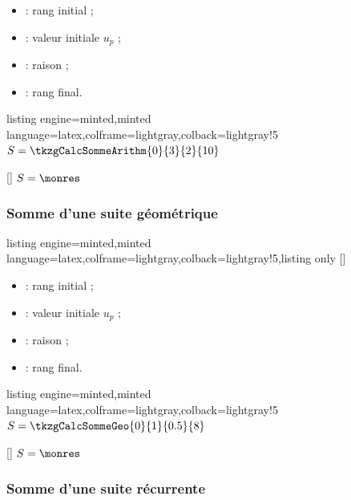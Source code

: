 \documentclass[11pt,a4paper]{ltxdoc}
\begin{document}
\begin{itemize}
  \item {} : rang initial ;
  \item {} : valeur initiale $u_p$ ;
  \item {} : raison ;
  \item {} : rang final.
\end{itemize}

\begin{tcblisting}{listing engine=minted,minted language=latex,colframe=lightgray,colback=lightgray!5}
$S = \tkzgCalcSommeArithm{0}{3}{2}{10}$

[\monres]
$S = \monres$
\end{tcblisting}

\subsubsection{Somme d'une suite géométrique}

\begin{tcblisting}{listing engine=minted,minted language=latex,colframe=lightgray,colback=lightgray!5,listing only}
[\macro]
\end{tcblisting}

\begin{itemize}
  \item {} : rang initial ;
  \item {} : valeur initiale $u_p$ ;
  \item {} : raison ;
  \item {} : rang final.
\end{itemize}

\begin{tcblisting}{listing engine=minted,minted language=latex,colframe=lightgray,colback=lightgray!5}
$S = \tkzgCalcSommeGeo{0}{1}{0.5}{8}$

[\monres]
$S = \monres$
\end{tcblisting}

\subsubsection{Somme d'une suite récurrente}
\end{document}
